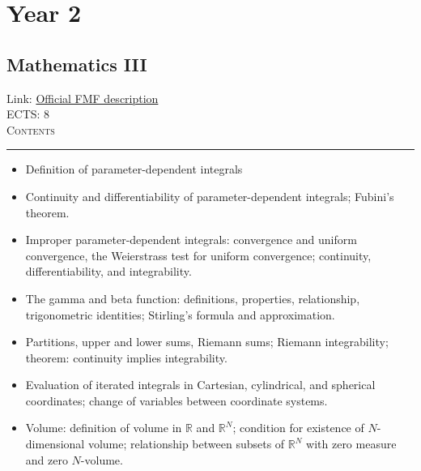 \documentclass[11pt, a4paper]{article}
\newenvironment{course}[3]{
\subsection{#1}%
Link: \href{#2}{Official FMF description}\\%
ECTS: #3%
\vspace{1ex}
\\
{\large \textsc{Contents}}\\[-0.9ex]%
\rule{\textwidth}{0.5pt}
\vspace{-3ex}
}
{}
\newenvironment{chapter}[1]{
\begin{tcolorbox}[title=#1, breakable]
}
{\end{tcolorbox}}
\begin{document}
\section{Year 2}
\begin{course}{Mathematics III}{https://www.fmf.uni-lj.si/en/study-physics/programmes/1fiz/2020/7000777/courses/522/}{8}
    \label{mathematics_3}

    \begin{chapter}{Parameter-dependent integrals}
        \begin{itemize}
        
            \item Definition of parameter-dependent integrals

            \item Continuity and differentiability of parameter-dependent integrals; Fubini's theorem.

            \item Improper parameter-dependent integrals: convergence and uniform convergence, the Weierstrass test for uniform convergence; continuity, differentiability, and integrability.

            \item The gamma and beta function: definitions, properties, relationship, trigonometric identities; Stirling's formula and approximation.
        
        \end{itemize}
        
    \end{chapter}

    \begin{chapter}{Multi-dimensional Riemann integration}
        \begin{itemize}
        
            \item Partitions, upper and lower sums, Riemann sums; Riemann integrability; theorem: continuity implies integrability.

            \item Evaluation of iterated integrals in Cartesian, cylindrical, and spherical coordinates; change of variables between coordinate systems.

            \item Volume: definition of volume in $ \mathbb{R} $ and $ \mathbb{R}^{N} $; condition for existence of $ N $-dimensional volume; relationship between subsets of $ \mathbb{R}^{N} $ with zero measure and zero $ N $-volume.


\end{itemize}
\end{chapter}
\end{course}
\end{document}
